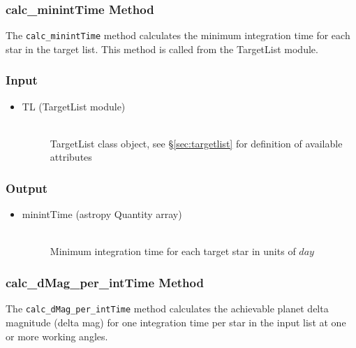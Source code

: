 \documentclass[cleanfoot]{asme2ej}
\begin{document}
\subsubsection{calc\_minintTime Method} \label{sec:calcminintTimetask}
The \verb+calc_minintTime+ method calculates the minimum integration time for each star in the target list.  This method is called from the TargetList module.

\subsubsection*{Input}
\begin{itemize}
\item 
\begin{description}
    \item[TL (TargetList module)] \hfill \\ TargetList class object, see \S\ref{sec:targetlist} for definition of available attributes
\end{description}
\end{itemize}

\subsubsection*{Output}
\begin{itemize}
\item
\begin{description}
    \item[minintTime (astropy Quantity array)] \hfill \\ Minimum integration time for each target star in units of $ day $
\end{description}
\end{itemize}

\subsubsection{calc\_dMag\_per\_intTime Method} \label{sec:calcdMagperintTime}
The \verb+calc_dMag_per_intTime+ method calculates the achievable planet delta magnitude (delta mag) for one integration time per star in the input list at one or more working angles.
\end{document}
